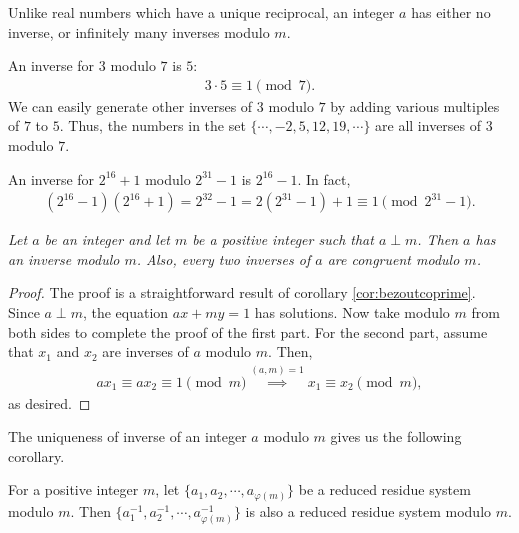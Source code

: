 \documentclass{subfile}
\begin{document}
	\begin{note}
		Unlike real numbers which have a unique reciprocal, an integer $a$ has either no inverse, or infinitely many inverses modulo $m$.
	\end{note}

	\begin{example}
		An inverse for $3$ modulo $7$ is $5$:
			\begin{align*}
				3 \cdot 5 \equiv 1 \pmod 7.
			\end{align*}
		We can easily generate other inverses of $3$ modulo $7$ by adding various multiples of $7$ to $5$. Thus, the numbers in the set $\{\cdots, -2, 5, 12, 19, \cdots \}$ are all inverses of $3$ modulo $7$.
	\end{example}

	\begin{example}
		An inverse for $2^{16}+1$ modulo $2^{31}-1$ is $2^{16}-1$. In fact,
			\begin{align*}
				(2^{16} - 1)(2^{16} + 1) = 2^{32} -1 = 2(2^{31} - 1) + 1 \equiv 1 \pmod{2^{31} - 1}.
			\end{align*}
	\end{example}


	\begin{theorem} \label{thm:arithinverse} \slshape
		Let $a$ be an integer and let $m$ be a positive integer such that $a \perp m$. Then $a$ has an inverse modulo $m$. Also, every two inverses of $a$ are congruent modulo $m$.
	\end{theorem}

	\begin{proof}
		The proof is a straightforward result of corollary \eqref{cor:bezoutcoprime}. Since $a \perp m$, the equation $ax+my=1$ has solutions. Now take modulo $m$ from both sides to complete the proof of the first part. For the second part, assume that $x_1$ and $x_2$ are inverses of $a$ modulo $m$. Then,
		\begin{align*}
		ax_1 \equiv ax_2 \equiv 1 \pmod m \stackrel{(a,m)=1}{\implies} x_1 \equiv x_2 \pmod m,
		\end{align*}
		as desired.
	\end{proof}

The uniqueness of inverse of an integer $a$ modulo $m$ gives us the following corollary.

	\begin{corollary}
		For a positive integer $m$, let $\{a_{1}, a_{2}, \cdots, a_{\varphi(m)}\}$ be a reduced residue system modulo $m$. Then $\{a_{1}^{-1}, a_{2}^{-1}, \cdots, a_{\varphi(m)}^{-1}\}$ is also a reduced residue system modulo $m$.
	\end{corollary}
\end{document}
